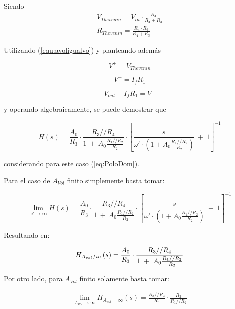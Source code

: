 Siendo 
\begin{align}
	V_{Thevenin} = V_{in} \cdot \frac{R_4}{R_4+R_3} \\
	R_{Thevenin} = \frac{R_4\cdot R_3}{R_4+R_3}
\label{eq:noinvthev}
\end{align} 

Utilizando (\ref{equ:avoligualvo}) y planteando además

\begin{equation}
	V^+ = V_{Thevenin}
	\label{equ:noinvv+}
\end{equation}

\begin{equation}
	V^- = I_f R_1
\end{equation}

\begin{equation}
	V_{out} - I_f R_1 = V^-
\end{equation}

y operando algebraicamente, se puede demostrar que

\begin{equation}
	H \left(s \right) =\frac{A_{0}}{R_3} \cdot	\frac{R_3 // R_4}{1 \ + \ A_{0} \frac{R_1 // R_2}{R_2} } \cdot \left[ \frac{s}{\omega' \cdot \left( 1 + A_{0} \frac{R_1 // R_2}{R_2} \right)}  \ + \ 1 \right]^{-1}
	\label{equ:noinvtransferencia}
\end{equation}

considerando para este caso (\ref{eq:PoloDom}).

Para el caso de $A_{Vol}$ finito simplemente basta tomar:

\begin{equation}
	\lim_{\omega'\to\infty} H \left(s \right) =\frac{A_{0}}{R_3} \cdot	\frac{R_3 // R_4}{1 \ + \ A_{0} \frac{R_1 // R_2}{R_2} } \cdot \left[ \frac{s}{\omega' \cdot \left( 1 + A_{0} \frac{R_1 // R_2}{R_2} \right)}  \ + \ 1 \right]^{-1}
\end{equation}

Resultando en:

\begin{equation}
	H_{A_{vol}\space fin}\left(s \right) =\frac{A_{0}}{R_3} \cdot	\frac{R_3 // R_4}{1 \ + \ A_{0} \frac{R_1 // R_2}{R_2} }
	\label{equ:noinvtransferencia_avolfinito}
\end{equation}

Por otro lado, para $A_{Vol}$ finito solamente basta tomar:

\begin{align}
	\lim_{A_{vol}\to\infty} H_{A_{vol}=\infty} \left(s \right) = \frac{R_3 // R_4}{R_3} \cdot \frac{R_2}{R_1 // R_2}
\end{align}

